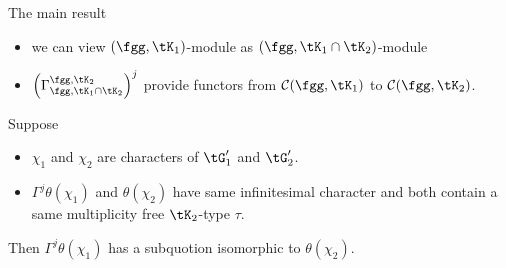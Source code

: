 \documentclass[final,hyperref={pdfpagelabels=false}]{beamer} %
\def\cR{{\mathcal{R}}}
\def\cC{\mathcal{C}}
\begin{document}
\begin{frame}
\begin{columns}[t]
\begin{column}{.48\linewidth}
\begin{block}{The main result}
\begin{itemize}
        \begin{itemize}
        \item we can view $(\fgg, \tK_1)$-module 
          as $(\fgg, \tK_1\cap \tK_2)$-module
        \item $\left(\Gamma_{\fgg,\tK_1\cap \tK_2}^{\fgg,\tK_2}\right)^j$ provide functors 
          from $\cC(\fgg, \tK_1)$ to $\cC(\fgg,\tK_2)$.
        \end{itemize}
     \end{itemize}
     Suppose
     \begin{itemize}
        \item $\chi_1$ and $\chi_2$ are characters of $\tG'_1$ and $\tG'_2$.
      \item $\Gamma^j\theta(\chi_1)$ and  $\theta(\chi_2)$ 
        have same infinitesimal character
        and both contain a same multiplicity free $\tK_2$-type $\tau$.
      \end{itemize}
      Then 
      $\Gamma^j\theta(\chi_1)$ 
      has a subquotion isomorphic to $\theta(\chi_2)$.
    \end{block}
    
\end{column}
\end{columns}
\end{frame}
\end{document}
